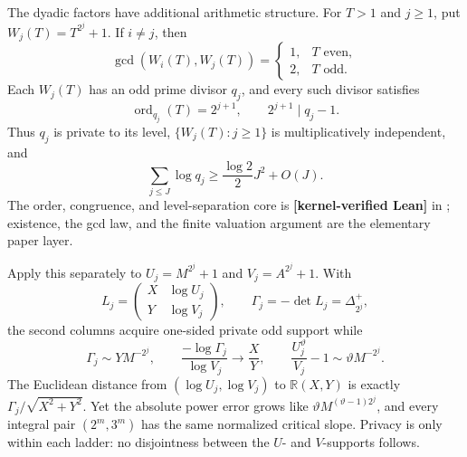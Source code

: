 \documentclass[11pt,oneside]{article}
\theoremstyle{definition}
\theoremstyle{remark}
\newcommand{\R}{\mathbb R}
\newcommand{\thetaq}{\vartheta}
\newcommand{\lean}[1]{\texttt{\detokenize{#1}}}
\newcommand{\statuslean}{\textcolor{leanblue}{\textbf{[kernel-verified Lean]}}}
\begin{document}
The dyadic factors have additional arithmetic structure.  For $T>1$ and $j\ge1$, put
$W_j(T)=T^{2^j}+1$.  If $i\ne j$, then
\begin{equation}
 \gcd(W_i(T),W_j(T))=
 \begin{cases}1,&T\text{ even},\\2,&T\text{ odd}.\end{cases}
 \label{crit:eq-dyadic-private-gcd}
\end{equation}
Each $W_j(T)$ has an odd prime divisor $q_j$, and every such divisor satisfies
\begin{equation}
 \operatorname{ord}_{q_j}(T)=2^{j+1},
 \qquad 2^{j+1}\mid q_j-1.
 \label{crit:eq-dyadic-private-order}
\end{equation}
Thus $q_j$ is private to its level, $\{W_j(T):j\ge1\}$ is multiplicatively independent,
and
\begin{equation}
 \sum_{j\le J}\log q_j\ge\frac{\log2}{2}J^2+O(J).
 \label{crit:eq-private-support-budget}
\end{equation}
The order, congruence, and level-separation core is \statuslean{} in
\lean{DyadicPrivateSupport}; existence, the gcd law, and the finite valuation argument are
the elementary paper layer.

Apply this separately to
$U_j=M^{2^j}+1$ and $V_j=A^{2^j}+1$.  With
\[
 L_j=\begin{pmatrix}X&\log U_j\\Y&\log V_j\end{pmatrix},
 \qquad \Gamma_j=-\det L_j=\Delta_{2^j}^+,
\]
the second columns acquire one-sided private odd support while
\begin{equation}
 \Gamma_j\sim YM^{-2^j},
 \qquad
 \frac{-\log\Gamma_j}{\log V_j}\longrightarrow\frac XY,
 \qquad
 \frac{U_j^{\thetaq}}{V_j}-1\sim\thetaq M^{-2^j}.
 \label{crit:eq-private-critical-slope}
\end{equation}
The Euclidean distance from $(\log U_j,\log V_j)$ to $\R(X,Y)$ is exactly
$\Gamma_j/\sqrt{X^2+Y^2}$.  Yet the absolute power error grows like
$\thetaq M^{(\thetaq-1)2^j}$, and every integral pair $(2^m,3^m)$ has the same normalized
critical slope.  Privacy is only within each ladder: no disjointness between the $U$- and
$V$-supports follows.
\end{document}
